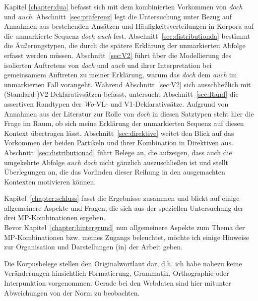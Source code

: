 Kapitel \ref{chapter:dua} befasst sich mit dem kombinierten Vorkommen von \textit{doch} und \textit{auch}. Abschnitt~\ref{sec:präferenz} legt die Untersuchung unter Bezug auf Annahmen aus bestehenden Ansätzen und Häufigkeitsverteilungen in Korpora auf die unmarkierte Sequenz \textit{doch auch} fest. Abschnitt~\ref{sec:distributionda} bestimmt die Äuße\-rungstypen, die durch die spätere Erklärung der unmarkierten Abfolge erfasst werden müssen. Abschnitt~\ref{sec:V2} führt über die Modellierung des isolierten Auftretens von \textit{doch} und \textit{auch} und ihrer Interpretation bei gemeinsamem Auftreten zu meiner Erklärung, warum das \textit{doch} dem \textit{auch} im unmarkierten Fall vorangeht. Während Abschnitt~\ref{sec:V2} sich aus\-schließlich mit (Standard-)V2-Deklarativsätzen befasst, untersucht Abschnitt~\ref{sec:Rand} die assertiven Randtypen der \textit{Wo}-VL- und V1-Deklarativsätze. Aufgrund von Annahmen aus der Literatur zur Rolle von \textit{doch} in diesen Satztypen steht hier die Frage im Raum, ob sich meine Erklärung der unmarkierten Sequenz auf diesen Kontext übertragen lässt. Abschnitt~\ref{sec:direktive} weitet den Blick auf das Vorkommen der beiden Partikeln und ihrer Kombination in Direktiven aus. Abschnitt~\ref{sec:distributionad} führt Belege an, die aufzeigen, dass auch die umgekehrte Abfolge \textit{auch doch} nicht gänz\-lich auszuschließen ist und stellt Überlegungen an, die das Vorfinden dieser Reihung in den ausgemach\-ten Kontexten motivieren können.

Kapitel~\ref{chapter:schluss} fasst die Ergebnisse zusammen und blickt auf einige allgemeinere Aspekte und Fragen, die sich aus der speziellen Untersuchung der drei MP-Kombi\-nationen ergeben.\\

\noindent
Bevor Kapitel~\ref{chapter:hintergrund} nun allgemeinere Aspekte zum Thema der MP-Kombinationen bzw. meines Zugangs beleuchtet, möchte ich einige Hinweise zur Organisation und Darstellungen (in) der Arbeit geben.

Die Korpusbelege stellen den Originalwortlaut dar, d.h. ich habe nahezu keine Veränderungen hinsichtlich Formatierung, Grammatik, Orthographie oder Interpunktion vorgenommen. Gerade bei den Webdaten sind hier mitunter Abwei\-chungen von der Norm zu beobachten.

